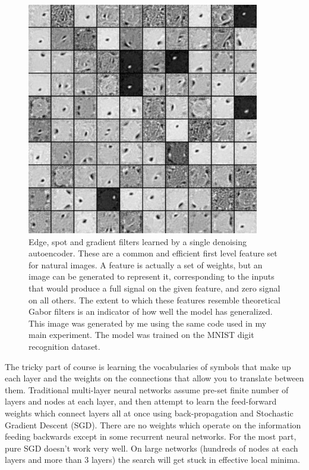 \documentclass[12pt]{article}
\begin{document}
\begin{doublespacing}
\begin{figure}[p]
\centering
\includegraphics[width=4in,height=4in]{filters_corruption_30}
\caption{Edge, spot and gradient filters learned by a single denoising autoencoder. These are a common and efficient first level feature set for natural images. A feature is actually a set of weights, but an image can be generated to represent it, corresponding to the inputs that would produce a full signal on the given feature, and zero signal on all others. The extent to which these features resemble theoretical Gabor filters is an indicator of how well the model has generalized. This image was generated by me using the same code used in my main experiment. The model was trained on the MNIST digit recognition dataset.}
\label{fig:gaborz}
\end{figure}
	
	The tricky part of course is learning the vocabularies of symbols that make up each layer and the weights on the connections that allow you to translate between them. Traditional multi-layer neural networks assume pre-set finite number of layers and nodes at each layer, and then attempt to learn the feed-forward weights which connect layers  all at once using back-propagation and Stochastic Gradient Descent (SGD). There are no weights which operate on the information feeding backwards except in some recurrent neural networks. For the most part, pure SGD doesn't work very well. On large networks (hundreds of nodes at each layers and more than 3 layers) the search will get stuck in effective local minima\cite{erhan2009difficulty, hinton2006reducing}.
	

\end{doublespacing}
\end{document}
